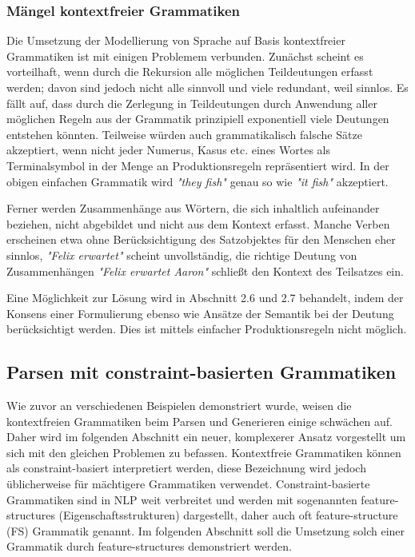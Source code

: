 \documentclass[12pt]{paper}
\begin{document}
\subsubsection{Mängel kontextfreier Grammatiken}
Die Umsetzung der Modellierung von Sprache auf Basis kontextfreier Grammatiken ist mit einigen Problemem verbunden. Zunächst scheint es vorteilhaft, wenn durch die Rekursion alle möglichen Teildeutungen erfasst werden; davon sind jedoch nicht alle sinnvoll und viele redundant, weil sinnlos. Es fällt auf, dass durch die Zerlegung in Teildeutungen durch Anwendung aller möglichen Regeln aus der Grammatik prinzipiell exponentiell viele Deutungen entstehen könnten. Teilweise würden auch grammatikalisch falsche Sätze akzeptiert, wenn nicht jeder Numerus, Kasus etc. eines Wortes als Terminalsymbol in der Menge an Produktionsregeln repräsentiert wird. In der obigen einfachen Grammatik wird \textit{"they fish"} genau so wie \textit{"it fish"} akzeptiert. 

Ferner werden Zusammenhänge aus Wörtern, die sich inhaltlich aufeinander beziehen, nicht abgebildet und nicht aus dem Kontext erfasst. Manche Verben erscheinen etwa ohne Berücksichtigung des Satzobjektes für den Menschen eher sinnlos, \textit{"Felix erwartet"} scheint unvollständig, die richtige Deutung von Zusammenhängen \textit{"Felix erwartet Aaron"} schließt den Kontext des Teilsatzes ein.

Eine Möglichkeit zur Lösung wird in Abschnitt 2.6 und 2.7 behandelt, indem der Konsens einer Formulierung ebenso wie Ansätze der Semantik bei der Deutung berücksichtigt werden. Dies ist mittels einfacher Produktionsregeln nicht möglich.

\subsection{Parsen mit constraint-basierten Grammatiken}
Wie zuvor an verschiedenen Beispielen demonstriert wurde, weisen die kontextfreien Grammatiken beim Parsen und Generieren einige schwächen auf. Daher wird im folgenden Abschnitt ein neuer, komplexerer Ansatz vorgestellt um sich mit den gleichen Problemen zu befassen. Kontextfreie Grammatiken können als constraint-basiert interpretiert werden, diese Bezeichnung wird jedoch üblicherweise für mächtigere Grammatiken verwendet. Constraint-basierte Grammatiken sind in NLP weit verbreitet und werden mit sogenannten feature-structures (Eigenschaftsstrukturen) dargestellt, daher auch oft feature-structure (FS) Grammatik genannt. Im folgenden Abschnitt soll die Umsetzung solch einer Grammatik durch feature-structures demonstriert werden.
\end{document}
